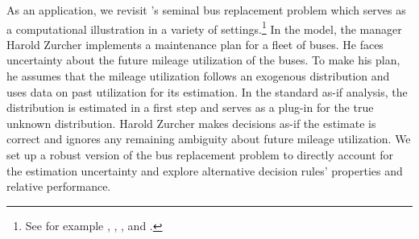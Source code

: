 {As an application, we revisit \cite{Rust.1987}'s seminal bus replacement problem which serves as a computational illustration in a variety of settings.\footnote{See for example \cite{Christensen.2019}, \cite{Iskhakov.2016}, \cite{Reich.2018}, and \cite{Su.2012a}.}  In the model, the manager Harold Zurcher implements a maintenance plan for a fleet of buses. He faces uncertainty about the future mileage utilization of the buses. To make his plan, he assumes that the mileage utilization follows an exogenous distribution and uses data on past utilization for its estimation. In the standard as-if analysis, the distribution is estimated in a first step and serves as a plug-in for the true unknown distribution. Harold Zurcher makes decisions as-if the estimate is correct and ignores any remaining ambiguity about future mileage utilization. We set up a robust version of the bus replacement problem to directly account for the estimation uncertainty and explore alternative decision rules' properties and relative performance.\\

}
